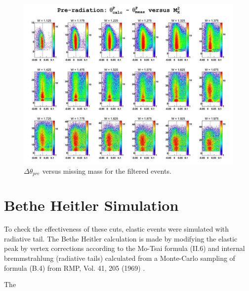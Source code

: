 \begin{landscape}
	\begin{figure}[ht]
	\centering
		\includegraphics[width=1.15\textheight]{img/dth2_epXmm2_all_cuts.jpg}
		\caption{$\Delta\theta_{pre}$ versus missing mass for the filtered events.}
	\label{fig:dth2_epXmm2_all_cuts}
	\end{figure}
\end{landscape}




\clearpage\newpage

\section{Bethe Heitler Simulation}
To check the effectiveness of these cuts, elastic events were simulated with radiative tail.
The Bethe Heitler calculation is made by modifying the elastic peak by vertex corrections
according to the Mo-Tsai formula (II.6) and internal bremmstrahlung (radiative tails) calculated from
a Monte-Carlo sampling of formula (B.4) from RMP, Vol. 41, 205 (1969) \cite{bib:elast_gen}.

The 


